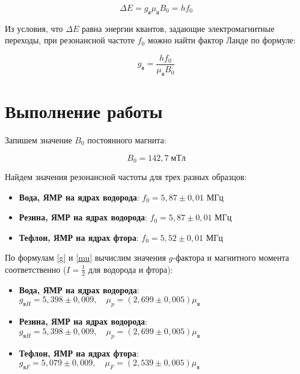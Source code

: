 \documentclass[12pt]{kiarticle}
\begin{document}
	\begin{equation}\label{}
	\Delta E = g_я \mu_я B_0 = hf_0
	\end{equation}
	
	Из условия, что $ \Delta E $ равна энергии квантов, задающие электромагнитные переходы, при резонансной частоте $ f_0 $ можно найти фактор Ланде по формуле:
	
	\begin{equation}\label{g}
	g_{я} = \dfrac{hf_0}{\mu_я B_0} 
	\end{equation}

	
	\section{Выполнение работы}
	
	Запишем значение $ B_0 $ постоянного магнита:
	
	\begin{equation}\label{}
	B_0 = 142,7 \; мТл
	\end{equation} 
	
	Найдем значения резонансной частоты для трех разных образцов:
	
	\begin{itemize}
		\item \textbf{Вода, ЯМР на ядрах водорода}: $ f_0 = 5,87 \pm 0,01 $ МГц
			
		\item \textbf{Резина, ЯМР на ядрах водорода}: $ f_0 = 5,87 \pm 0,01 $ МГц
			
		\item \textbf{Тефлон, ЯМР на ядрах фтора}: $ f_0 = 5,52 \pm 0,01 $ МГц
	\end{itemize}
	
	По формулам \eqref{g} и \eqref{mu} вычислим значения $ g $-фактора и магнитного момента соответственно ($ I = \frac{1}{2} $ для водорода и фтора): 
	
	\begin{itemize}
		\item \textbf{Вода, ЯМР на ядрах водорода}: $ g_{яH} = 5,398 \pm 0,009, \quad \mu_p  = (2,699 \pm 0,005)\mu_я $ 
		
		\item \textbf{Резина, ЯМР на ядрах водорода}: $ g_{яH} = 5,398 \pm 0,009, \quad \mu_p   = (2,699 \pm 0,005)\mu_я  $ 
		
		\item \textbf{Тефлон, ЯМР на ядрах фтора}: $ g_{яF} = 5,079 \pm 0,009, \quad \mu_F  = (2,539 \pm 0,005)\mu_я  $ 
	\end{itemize}
\end{document}
